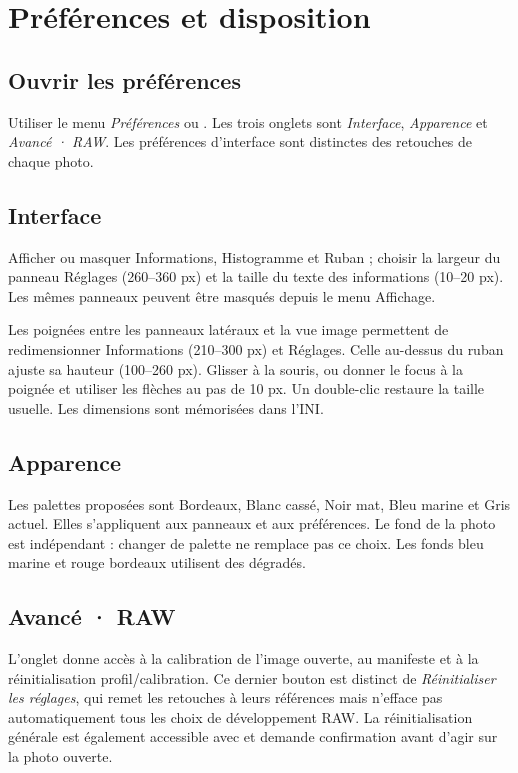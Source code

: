 \chapter{Préférences et disposition}
\section{Ouvrir les préférences}
Utiliser le menu \emph{Préférences} ou . Les trois onglets
sont \emph{Interface}, \emph{Apparence} et \emph{Avancé · RAW}.
Les préférences d’interface sont distinctes des retouches de chaque photo.

\section{Interface}
Afficher ou masquer Informations, Histogramme et Ruban ; choisir la largeur
du panneau Réglages (260--360 px) et la taille du texte des informations
(10--20 px). Les mêmes panneaux peuvent être masqués depuis le menu Affichage.

Les poignées entre les panneaux latéraux et la vue image permettent de
redimensionner Informations (210--300 px) et Réglages. Celle au-dessus du ruban
ajuste sa hauteur (100--260 px). Glisser à la souris, ou donner le focus à
la poignée et utiliser les flèches au pas de 10 px. Un double-clic restaure
la taille usuelle. Les dimensions sont mémorisées dans l’INI.

\section{Apparence}
Les palettes proposées sont Bordeaux, Blanc cassé, Noir mat, Bleu marine et
Gris actuel. Elles s’appliquent aux panneaux et aux préférences. Le fond de
la photo est indépendant : changer de palette ne remplace pas ce choix.
Les fonds bleu marine et rouge bordeaux utilisent des dégradés.


\section{Avancé · RAW}
L’onglet donne accès à la calibration de l’image ouverte, au manifeste et à
la réinitialisation profil/calibration. Ce dernier bouton est distinct de
\emph{Réinitialiser les réglages}, qui remet les retouches à leurs références
mais n’efface pas automatiquement tous les choix de développement RAW.
La réinitialisation générale est également accessible avec
 et demande confirmation avant d’agir sur la photo ouverte.

